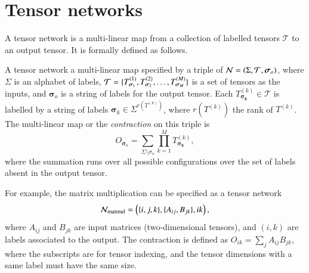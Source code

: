 \documentclass[review, onefignum, onetabnum]{siamart190516}
\begin{document}
\section{Tensor networks}\label{sec:tn}
A tensor network is a multi-linear map from a collection of labelled tensors $\mathcal{T}$ to an output tensor.
It is formally defined as follows.
\begin{definition}
    A tensor network a multi-linear map specified by a triple of $\mathcal{N} = (\Sigma, {\mathcal{T}}, \boldsymbol{\sigma}_o)$,
    where $\Sigma$ is an alphabet of labels,
    ${\mathcal{T}} = \{T^{(1)}_{\boldsymbol{\sigma}_1}, T^{(2)}_{\boldsymbol{\sigma}_2}, \ldots, T^{(M)}_{\boldsymbol{\sigma}_M}\}$ is a set of tensors as the inputs,
    and $\boldsymbol{\sigma}_o$ is a string of labels for the output tensor.
    Each $T^{(k)}_{\boldsymbol{\sigma_k}} \in \mathcal{T}$ is labelled by a string of labels $\boldsymbol{\sigma}_k \in \Sigma^{r(T^{(k)})}$, where $r(T^{(k)})$ the rank of $T^{(k)}$.
    The multi-linear map or the \emph{contraction} on this triple is
    \begin{equation}
        O_{\boldsymbol{\sigma}_o} = \sum_{\Sigma \setminus \sigma_o} \prod_{k=1}^{M} T^{(k)}_{\boldsymbol{\sigma_k}},
    \end{equation}
    where the summation runs over all possible configurations over the set of labels absent in the output tensor.
\end{definition}
For example, the matrix multiplication can be specified as a tensor network
\begin{equation}
\mathcal{N}_{\rm matmul} = \left(\{i,j,k\}, \{A_{ij}, B_{jk}\}, ik\right),
\end{equation}
where $A_{ij}$ and $B_{jk}$ are input matrices (two-dimensional tensors), and $(i,k)$ are labels associated to the output.
The contraction is defined as $O_{ik} = \sum_j A_{ij}B_{jk}$, where the subscripts are for tensor indexing, and the tensor dimensions with a same label must have the same size.
\end{document}
